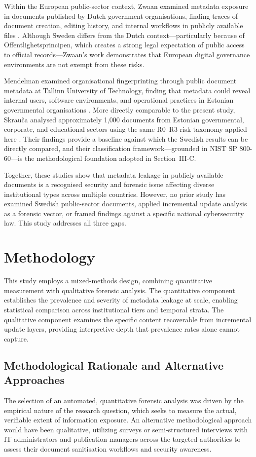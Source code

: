 \documentclass[conference]{IEEEtran}
\begin{document}
Within the European public-sector context, Zwaan examined metadata exposure in documents published by Dutch government organisations, finding traces of document creation, editing history, and internal workflows in publicly available files \cite{mulder2017}. Although Sweden differs from the Dutch context---particularly because of Offentlighetsprincipen, which creates a strong legal expectation of public access to official records---Zwaan's work demonstrates that European digital governance environments are not exempt from these risks.

Mendelman examined organisational fingerprinting through public document metadata at Tallinn University of Technology, finding that metadata could reveal internal users, software environments, and operational practices in Estonian governmental organisations \cite{mendelman2018}. More directly comparable to the present study, Skrau\v{c}a analysed approximately 1,000 documents from Estonian governmental, corporate, and educational sectors using the same R0--R3 risk taxonomy applied here \cite{skrauca2026}. Their findings provide a baseline against which the Swedish results can be directly compared, and their classification framework---grounded in NIST SP 800-60---is the methodological foundation adopted in Section~III-C.

Together, these studies show that metadata leakage in publicly available documents is a recognised security and forensic issue affecting diverse institutional types across multiple countries. However, no prior study has examined Swedish public-sector documents, applied incremental update analysis as a forensic vector, or framed findings against a specific national cybersecurity law. This study addresses all three gaps.

\section{Methodology} %
This study employs a mixed-methods design, combining quantitative measurement with qualitative forensic analysis. The quantitative component establishes the prevalence and severity of metadata leakage at scale, enabling statistical comparison across institutional tiers and temporal strata. The qualitative component examines the specific content recoverable from incremental update layers, providing interpretive depth that prevalence rates alone cannot capture. 

\subsection{Methodological Rationale and Alternative Approaches}
The selection of an automated, quantitative forensic analysis was driven by the empirical nature of the research question, which seeks to measure the actual, verifiable extent of information exposure. An alternative methodological approach would have been qualitative, utilizing surveys or semi-structured interviews with IT administrators and publication managers across the targeted authorities to assess their document sanitisation workflows and security awareness. 
\end{document}
